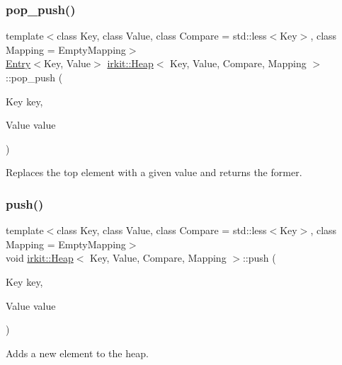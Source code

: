 \subsubsection{\texorpdfstring{pop\+\_\+push()}{pop\_push()}}
{\footnotesize\ttfamily template$<$class Key, class Value, class Compare = std\+::less$<$\+Key$>$, class Mapping = Empty\+Mapping$>$ \\
\hyperlink{structirkit_1_1Entry}{Entry}$<$Key, Value$>$ \hyperlink{classirkit_1_1Heap}{irkit\+::\+Heap}$<$ Key, Value, Compare, Mapping $>$\+::pop\+\_\+push (\begin{DoxyParamCaption}\item[{Key}]{key,  }\item[{Value}]{value }\end{DoxyParamCaption})\hspace{0.3cm}{\ttfamily [inline]}}



Replaces the top element with a given value and returns the former. 

\mbox{\label{classirkit_1_1Heap_a8e2dfbd02e7411fe97281b5e7d19f12c}} 
\subsubsection{\texorpdfstring{push()}{push()}}
{\footnotesize\ttfamily template$<$class Key, class Value, class Compare = std\+::less$<$\+Key$>$, class Mapping = Empty\+Mapping$>$ \\
void \hyperlink{classirkit_1_1Heap}{irkit\+::\+Heap}$<$ Key, Value, Compare, Mapping $>$\+::push (\begin{DoxyParamCaption}\item[{Key}]{key,  }\item[{Value}]{value }\end{DoxyParamCaption})\hspace{0.3cm}{\ttfamily [inline]}}



Adds a new element to the heap. 

\mbox{\label{classirkit_1_1Heap_ae4652d2601229e4de97f0321adf5f3c6}} 
